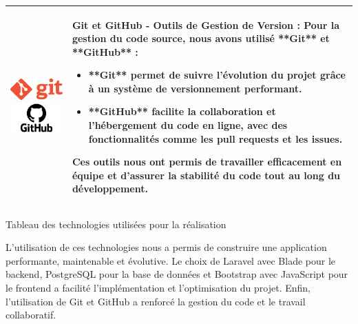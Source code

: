 \begin{longtable}{|m{4cm}|m{10cm}|}
    \includegraphics[width=3cm]{images/logo/git.png}  
    \includegraphics[width=3cm]{images/logo/github.png} & 
    \textbf{Git et GitHub - Outils de Gestion de Version} : Pour la gestion du code source, nous avons utilisé **Git** et **GitHub** :  
    \begin{itemize}
        \item **Git** permet de suivre l'évolution du projet grâce à un système de versionnement performant.
        \item **GitHub** facilite la collaboration et l’hébergement du code en ligne, avec des fonctionnalités comme les pull requests et les issues.
    \end{itemize}
    Ces outils nous ont permis de travailler efficacement en équipe et d’assurer la stabilité du code tout au long du développement.\\
    \hline

\end{longtable}
\begin{table}[h]
    \centering
    \caption{Tableau des technologies utilisées pour la réalisation} %
    \label{tab:table_techs_realisation} %
   
\end{table}
L’utilisation de ces technologies nous a permis de construire une application performante, maintenable et évolutive. Le choix de Laravel avec Blade pour le backend, PostgreSQL pour la base de données et Bootstrap avec JavaScript pour le frontend a facilité l’implémentation et l’optimisation du projet. Enfin, l’utilisation de Git et GitHub a renforcé la gestion du code et le travail collaboratif.

